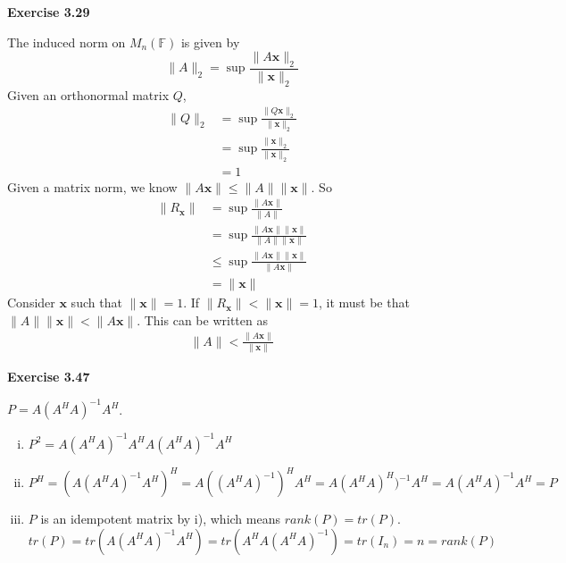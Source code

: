 \documentclass[letterpaper,12pt]{article}
\newcommand{\vect}[1]{\mathbf{#1}}
\begin{document}
\textbf{Exercise 3.29}

The induced norm on $M_n(\mathbb F)$ is given by
$$
\| A \|_2 = \sup \frac{\|A \vect{x} \|_2}{\| \vect{x} \|_2}
$$
Given an orthonormal matrix $Q$,
\begin{align*}
  \| Q \|_2 &= \sup \frac{\|Q \vect{x} \|_2}{\| \vect{x} \|_2} \\
  &= \sup \frac{\|\vect{x} \|_2}{\| \vect{x} \|_2} \\
  &= 1
\end{align*}
Given a matrix norm, we know $\|A \vect{x} \| \leq \|A \| \|\vect{x} \|$. So
\begin{align*}
  \|R_{\vect{x}}\| &= \sup \frac{\| A\vect{x} \|}{\|A\|} \\
  &= \sup \frac{\| A\vect{x} \| \| \vect{x} \| }{\|A\| \| \vect{x} \|} \\
  &\leq \sup \frac{\| A\vect{x} \| \| \vect{x} \| }{\|A \vect{x} \|} \\
  &= \| \vect{x} \|
\end{align*}
Consider $\vect{x}$ such that $\|\vect{x}\| = 1$.
If $\|R_{\vect{x}}\| < \|\vect{x}\| = 1$, it must be that $\|A\|\|\vect{x}\| < \|A \vect{x} \|$. This can be written as
\begin{align*}
  \| A \| < \frac{\|A \vect{x}\|}{\|\vect{x}\|}
\end{align*}

\textbf{Exercise 3.47}

$P = A(A^HA)^{-1}A^H$.

\begin{enumerate}[i.]
  \item $P^2 = A(A^HA)^{-1}A^H A(A^HA)^{-1}A^H$
  \item $P^H = (A(A^HA)^{-1}A^H)^H = A ((A^HA)^{-1})^H A^H
        = A (A^HA)^H)^{-1} A^H = A (A^HA)^{-1} A^H = P$
  \item $P$ is an idempotent matrix by i), which means $rank(P) =     tr(P)$.
        $$
        tr(P) = tr(A(A^HA)^{-1}A^H) = tr(A^HA(A^HA)^{-1}) = tr(I_n) = n = rank(P)
        $$
        
\end{enumerate}
\end{document}

